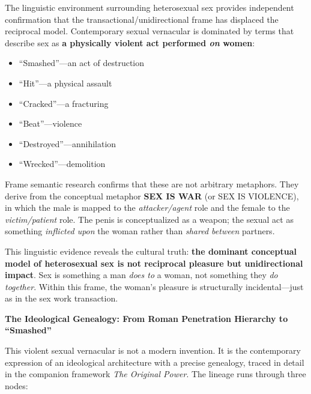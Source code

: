\documentclass[12pt,openany]{book}
\numberwithin{equation}{chapter}
\begin{document}
The linguistic environment surrounding heterosexual sex provides independent confirmation that the transactional/unidirectional frame has displaced the reciprocal model. Contemporary sexual vernacular is dominated by terms that describe sex as \textbf{a physically violent act performed \textit{on} women}:

\begin{itemize}
    \item ``Smashed''---an act of destruction
    \item ``Hit''---a physical assault
    \item ``Cracked''---a fracturing
    \item ``Beat''---violence
    \item ``Destroyed''---annihilation
    \item ``Wrecked''---demolition
\end{itemize}

Frame semantic research confirms that these are not arbitrary metaphors. They derive from the conceptual metaphor \textbf{SEX IS WAR} (or SEX IS VIOLENCE), in which the male is mapped to the \textit{attacker/agent} role and the female to the \textit{victim/patient} role. The penis is conceptualized as a weapon; the sexual act as something \textit{inflicted upon} the woman rather than \textit{shared between} partners.

This linguistic evidence reveals the cultural truth: \textbf{the dominant conceptual model of heterosexual sex is not reciprocal pleasure but unidirectional impact}. Sex is something a man \textit{does to} a woman, not something they \textit{do together}. Within this frame, the woman's pleasure is structurally incidental---just as in the sex work transaction.

\textbf{The Ideological Genealogy: From Roman Penetration Hierarchy to ``Smashed''}

This violent sexual vernacular is not a modern invention. It is the contemporary expression of an ideological architecture with a precise genealogy, traced in detail in the companion framework \textit{The Original Power}. The lineage runs through three nodes:
\end{document}
